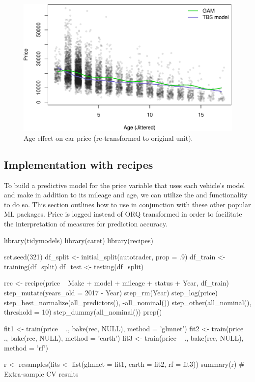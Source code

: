 \begin{Schunk}
\begin{figure}

{\centering \includegraphics[width=0.8\linewidth]{figs/gam_tbs_model-1} 

}

\caption[Age effect on car price (re-transformed to original unit)]{Age effect on car price (re-transformed to original unit).}\label{fig:gam_tbs_model}
\end{figure}
\end{Schunk}

\hypertarget{implementation-with-recipes}{%
\subsection{Implementation with
recipes}\label{implementation-with-recipes}}

To build a predictive model for the price variable that uses each
vehicle's model and make in addition to its mileage and age, we can
utilize the  and  functionality to do so. This
section outlines how to use  in conjunction with
these other popular ML packages. Price is logged instead of ORQ
transformed in order to facilitate the interpretation of measures for
prediction accuracy.

\begin{Schunk}
\begin{Sinput}
library(tidymodels)
library(caret)
library(recipes)

set.seed(321)
df_split <- initial_split(autotrader, prop = .9)
df_train <- training(df_split)
df_test <- testing(df_split)

rec <- recipe(price ~ Make + model +  mileage + status + Year, df_train) %
  step_mutate(years_old = 2017 - Year) %
  step_rm(Year) %
  step_log(price) %
  step_best_normalize(all_predictors(), -all_nominal()) %
  step_other(all_nominal(), threshold = 10) %
  step_dummy(all_nominal()) %
  prep()

fit1 <- train(price ~ ., bake(rec, NULL), method = 'glmnet')
fit2 <- train(price ~ ., bake(rec, NULL), method = 'earth')
fit3 <- train(price ~ ., bake(rec, NULL), method = 'rf')

r <- resamples(fits <- list(glmnet = fit1, earth = fit2, rf = fit3))
summary(r) # Extra-sample CV results
\end{Sinput}
\end{Schunk}

